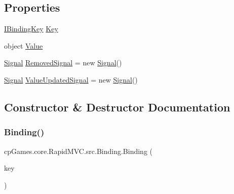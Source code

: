 \subsection*{Properties}
\begin{DoxyCompactItemize}
\item 
\mbox{\hyperlink{interfacecp_games_1_1core_1_1_rapid_m_v_c_1_1_i_binding_key}{I\+Binding\+Key}} \mbox{\hyperlink{classcp_games_1_1core_1_1_rapid_m_v_c_1_1src_1_1_binding_a9b77c4fc67ecf3d016ff0d90637d0f88}{Key}}
\item 
object \mbox{\hyperlink{classcp_games_1_1core_1_1_rapid_m_v_c_1_1src_1_1_binding_a7c9fdf154e45fdeb327d8fa112cf56e4}{Value}}
\item 
\mbox{\hyperlink{classcp_games_1_1core_1_1_rapid_m_v_c_1_1_signal}{Signal}} \mbox{\hyperlink{classcp_games_1_1core_1_1_rapid_m_v_c_1_1src_1_1_binding_a9cfc0698ea8efcd69bf6602b3e0aab35}{Removed\+Signal}} = new \mbox{\hyperlink{classcp_games_1_1core_1_1_rapid_m_v_c_1_1_signal}{Signal}}()
\item 
\mbox{\hyperlink{classcp_games_1_1core_1_1_rapid_m_v_c_1_1_signal}{Signal}} \mbox{\hyperlink{classcp_games_1_1core_1_1_rapid_m_v_c_1_1src_1_1_binding_a2ddb5b8252f62d19490f66734e654400}{Value\+Updated\+Signal}} = new \mbox{\hyperlink{classcp_games_1_1core_1_1_rapid_m_v_c_1_1_signal}{Signal}}()
\end{DoxyCompactItemize}


\subsection{Constructor \& Destructor Documentation}
\mbox{\label{classcp_games_1_1core_1_1_rapid_m_v_c_1_1src_1_1_binding_a9226f1b3fcbdaf396822507557679556}} 
\subsubsection{\texorpdfstring{Binding()}{Binding()}}
{\footnotesize\ttfamily cp\+Games.\+core.\+Rapid\+M\+V\+C.\+src.\+Binding.\+Binding (\begin{DoxyParamCaption}\item[{\mbox{\hyperlink{interfacecp_games_1_1core_1_1_rapid_m_v_c_1_1_i_binding_key}{I\+Binding\+Key}}}]{key }\end{DoxyParamCaption})}



